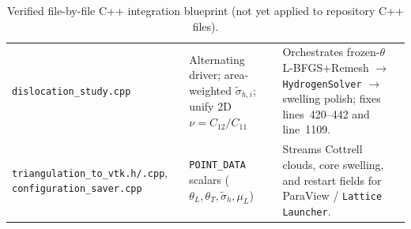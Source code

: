 \documentclass[11pt,a4paper]{article}
\newcommand{\code}[1]{\texttt{#1}}
\begin{document}
\begin{table}[ht!]
\begin{tabular}{@{} >{\raggedright\arraybackslash}p{4.4cm} >{\raggedright\arraybackslash}p{4.8cm} >{\raggedright\arraybackslash}p{6.0cm} @{}}
\addlinespace[2pt]
\code{dislocation\_study.cpp} & Alternating driver; area-weighted $\tilde{\sigma}_{h,i}$; unify 2D $\nu = C_{12}/C_{11}$ & Orchestrates frozen-$\theta$ L-BFGS+Remesh $\to$ \code{HydrogenSolver} $\to$ swelling polish; fixes lines~420--442 and line~1109. \\
\addlinespace[2pt]
\code{triangulation\_\allowbreak to\_vtk.h/.cpp}, \code{configuration\_\allowbreak saver.cpp} & \code{POINT\_DATA} scalars ($\theta_L, \theta_T, \tilde{\sigma}_h, \mu_L$) & Streams Cottrell clouds, core swelling, and restart fields for ParaView / \code{Lattice Launcher}. \\
\bottomrule
\end{tabular}
\caption{Verified file-by-file C++ integration blueprint (not yet applied to repository C++ files).}
\label{tab:codebase}
\end{table}
\end{document}
